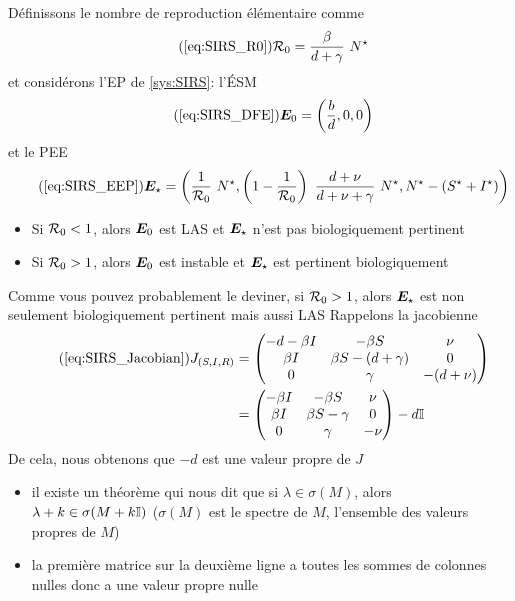 \documentclass[aspectratio=169]{beamer}\usepackage[]{graphicx}\usepackage[]{xcolor}
\begin{document}
\begin{frame}
\begin{theorem}\label{th:SIRS_LAS_DFE}
Définissons le nombre de reproduction élémentaire comme
\begin{equation}\tag{\ref{eq:SIRS_R0}}
\R_0 = \frac\beta{d+\gamma}\ N^\star
\end{equation}
et considérons l'EP de \eqref{sys:SIRS}: l'ÉSM
\begin{equation}\tag{\ref{eq:SIRS_DFE}}
\bE_0=
\left(\frac bd, 0, 0\right)
\end{equation}
et le PEE
\begin{equation}\tag{\ref{eq:SIRS_EEP}}
\bE_\star=
\left(
\frac{1}{\R_0}\ N^\star,
\left(1-\frac{1}{\R_0}\right)\
\frac{d+\nu}{d+\nu+\gamma}\ N^\star,
N^\star-(S^\star+I^\star)
\right)
\end{equation}
\vskip0.5cm
\begin{itemize}
\item Si $\mathcal{R}_0<1$, alors $\bm{E}_0$ est LAS et $\bm{E}_\star$ n'est pas biologiquement pertinent
\item Si $\mathcal{R}_0>1$, alors $\bm{E}_0$ est instable et $\bm{E}_\star$ est pertinent biologiquement
\end{itemize}
\end{theorem}
\end{frame}

\begin{frame}
Comme vous pouvez probablement le deviner, si $\mathcal{R}_0>1$, alors $\bm{E}_\star$ est non seulement biologiquement pertinent mais aussi LAS
\vfill
Rappelons la jacobienne
\begin{align}
\tag{\ref{eq:SIRS_Jacobian}}
J_{(S,I,R)} &=
\begin{pmatrix}
-d-\beta I & -\beta S & \nu \\
\beta I & \beta S-(d+\gamma) & 0 \\
0 & \gamma & -(d+\nu)
\end{pmatrix} \\
&= \begin{pmatrix}
-\beta I & -\beta S & \nu \\
\beta I & \beta S-\gamma & 0 \\
0 & \gamma & -\nu
\end{pmatrix}
-d\II  \nonumber
\end{align}
\vfill
De cela, nous obtenons que $-d$ est une valeur propre de $J$
\begin{itemize}
\item il existe un théorème qui nous dit que si $\lambda\in\sigma(M)$, alors $\lambda+k\in\sigma(M+k\mathbb{I})$ \qquad($\sigma(M)$ est le spectre de $M$, l'ensemble des valeurs propres de $M$)
\item la première matrice sur la deuxième ligne a toutes les sommes de colonnes nulles donc a une valeur propre nulle
\end{itemize}
\end{frame}
\end{document}
